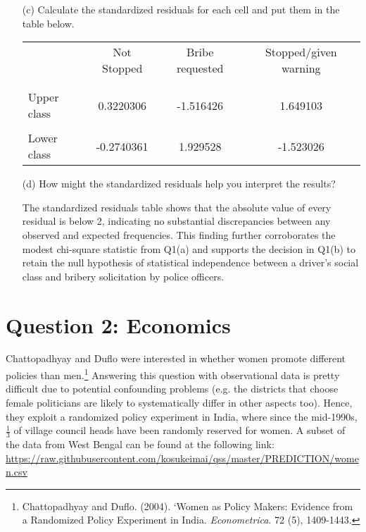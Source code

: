 \documentclass[12pt,letterpaper]{article}
\begin{document}
\begin{enumerate}
		\item [(c)] Calculate the standardized residuals for each cell and put them in the table below.
		
		\begin{table}[H]
			\centering
			\begin{tabular}{l | c c c }
				& Not Stopped & Bribe requested & Stopped/given warning \\ \\[-1.8ex] \hline \\[-1.8ex]
				Upper class &0.3220306 & -1.516426 & 1.649103 \\ \\ 
				Lower class & -0.2740361 & 1.929528 & -1.523026 \\
			\end{tabular}
		\end{table}
		
		\item [(d)] How might the standardized residuals help you interpret the results?
		
		The standardized residuals table shows that the absolute value of every residual is below 2, indicating no substantial discrepancies between any observed and expected frequencies. This finding further corroborates the modest chi-square statistic from Q1(a) and supports the decision in Q1(b) to retain the null hypothesis of statistical independence between a driver's social class and bribery solicitation by police officers.
		
	\end{enumerate}
	
	\section*{Question 2: Economics}
	Chattopadhyay and Duflo were interested in whether women promote different policies than men.\footnote{Chattopadhyay and Duflo. (2004). `Women as Policy Makers: Evidence from a Randomized Policy Experiment in India. \textit{Econometrica}. 72 (5), 1409-1443.} Answering this question with observational data is pretty difficult due to potential confounding problems (e.g. the districts that choose female politicians are likely to systematically differ in other aspects too). Hence, they exploit a randomized policy experiment in India, where since the mid-1990s, $\frac{1}{3}$ of village council heads have been randomly reserved for women. A subset of the data from West Bengal can be found at the following link: \url{https://raw.githubusercontent.com/kosukeimai/qss/master/PREDICTION/women.csv}
	
\end{document}
